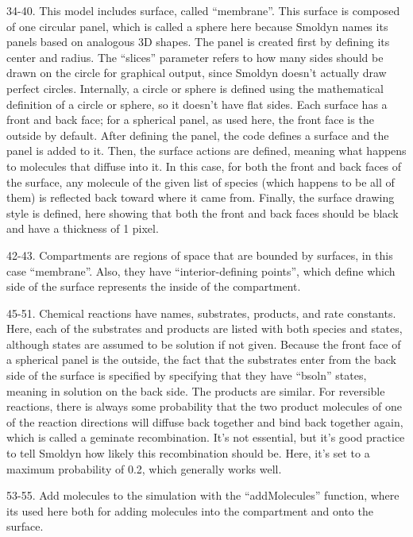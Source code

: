 \documentclass {book}
\begin{document}
\begin{description}
\item{34-40.} This model includes surface, called ``membrane''. This surface is composed of one circular panel, which is called a sphere here because Smoldyn names its panels based on analogous 3D shapes. The panel is created first by defining its center and radius. The ``slices'' parameter refers to how many sides should be drawn on the circle for graphical output, since Smoldyn doesn't actually draw perfect circles. Internally, a circle or sphere is defined using the mathematical definition of a circle or sphere, so it doesn't have flat sides. Each surface has a front and back face; for a spherical panel, as used here, the front face is the outside by default. After defining the panel, the code defines a surface and the panel is added to it. Then, the surface actions are defined, meaning what happens to molecules that diffuse into it. In this case, for both the front and back faces of the surface, any molecule of the given list of species (which happens to be all of them) is reflected back toward where it came from. Finally, the surface drawing style is defined, here showing that both the front and back faces should be black and have a thickness of 1 pixel.

\item{42-43.} Compartments are regions of space that are bounded by surfaces, in this case ``membrane''. Also, they have ``interior-defining points'', which define which side of the surface represents the inside of the compartment.

\item{45-51.} Chemical reactions have names, substrates, products, and rate constants. Here, each of the substrates and products are listed with both species and states, although states are assumed to be solution if not given. Because the front face of a spherical panel is the outside, the fact that the substrates enter from the back side of the surface is specified by specifying that they have ``bsoln'' states, meaning in solution on the back side. The products are similar. For reversible reactions, there is always some probability that the two product molecules of one of the reaction directions will diffuse back together and bind back together again, which is called a geminate recombination. It's not essential, but it's good practice to tell Smoldyn how likely this recombination should be. Here, it's set to a maximum probability of 0.2, which generally works well.

\item{53-55.} Add molecules to the simulation with the ``addMolecules'' function, where its used here both for adding molecules into the compartment and onto the surface.


\end{description}
\end{document}
